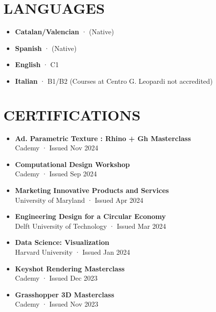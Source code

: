\documentclass[11pt,a4paper]{article}
\begin{document}
\section*{LANGUAGES}
\begin{itemize}[leftmargin=*,label={},itemsep=2pt]
    \item \textbf{Catalan/Valencian} · (Native)

    \item \textbf{Spanish} · (Native)
    
    \item \textbf{English} · C1
    
    \item \textbf{Italian} · B1/B2 (Courses at Centro G. Leopardi not accredited)
\end{itemize}

\section*{CERTIFICATIONS}
\begin{itemize}[leftmargin=*,label={},itemsep=2pt]
    \item \textbf{Ad. Parametric Texture : Rhino + Gh Masterclass}\\
    Cademy · Issued Nov 2024
    
    \item \textbf{Computational Design Workshop}\\
    Cademy · Issued Sep 2024
    
    \item \textbf{Marketing Innovative Products and Services}\\
    University of Maryland · Issued Apr 2024
    
    \item \textbf{Engineering Design for a Circular Economy}\\
    Delft University of Technology · Issued Mar 2024
    
    \item \textbf{Data Science: Visualization}\\
    Harvard University · Issued Jan 2024
    
    \item \textbf{Keyshot Rendering Masterclass}\\
    Cademy · Issued Dec 2023
    
    \item \textbf{Grasshopper 3D Masterclass}\\
    Cademy · Issued Nov 2023
\end{itemize}
\end{document}
